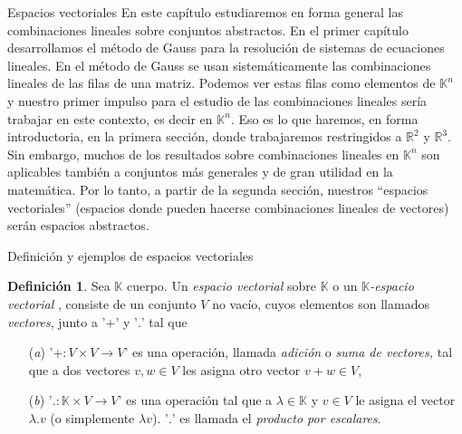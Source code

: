 \documentclass[a4paper,12pt,twoside,spanish,reqno]{amsbook}
\theoremstyle{definition}
\newtheorem{definicion}{Definici\'on}[section]
\theoremstyle{remark}
\newcommand{\R}{\mathbb R}
\newcommand{\K}{\mathbb K}
\begin{document}
    \begin{chapter}{Espacios vectoriales}\label{chap-esp-vect} En este capítulo estudiaremos en forma general las combinaciones lineales sobre conjuntos abstractos.
        En el primer capítulo desarrollamos el método de Gauss para la resolución de sistemas de ecuaciones lineales. En el método de Gauss se usan sistemáticamente las combinaciones lineales de las filas de una matriz. Podemos ver estas filas como elementos de $\K^n$  y nuestro primer impulso para el estudio de las combinaciones lineales sería trabajar en este contexto, es decir  en $\K^n$. Eso es lo que haremos, en forma introductoria, en la primera sección, donde trabajaremos restringidos a   $\R^2$ y $\R^3$.   Sin embargo, muchos de los resultados sobre combinaciones lineales en $\K^n$ son aplicables también a conjuntos más generales y de gran utilidad en la matemática. Por lo tanto,  a partir de la segunda sección,  nuestros ``espacios vectoriales'' (espacios donde pueden hacerse combinaciones lineales de vectores) serán espacios abstractos. 
        

        

        
        \begin{section}{Definición y ejemplos de espacios vectoriales}
            
            \begin{definicion}\label{def-esp-vect} Sea $\K$ cuerpo. Un \textit{espacio vectorial} sobre $\K$ o un \textit{$\K$-espacio vectorial }, consiste de  un  conjunto $V$ no vacío, cuyos elementos son llamados \textit{vectores}, junto a  '$+$' y '$.$' tal que
                \begin{enumerate}
                    \item[(\textit{a})] '$+\colon V\times V\to V$' es una operación, llamada \textit{adición} o  \textit{suma de vectores,} tal que a dos vectores $v,w \in V$ les asigna otro vector $v+w \in V$,
                    \item[(\textit{b})]  '$.
                     \colon \K\times V\to V$' es una operación tal que a $\lambda \in \K$ y $v \in V$ le asigna el vector $\lambda.v$ (o simplemente $\lambda v$).  '$.$' es llamada  el \textit{producto por escalares}.
                    

\end{enumerate}
\end{definicion}
\end{section}
\end{chapter}
\end{document}

